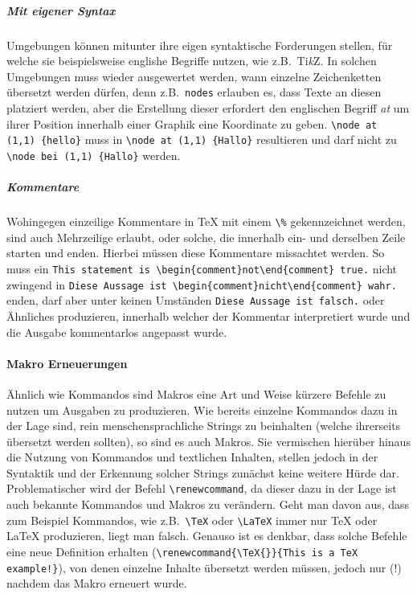\subparagraph*{Mit eigener Syntax}\par
Umgebungen können mitunter ihre eigen syntaktische Forderungen stellen, für welche sie beispielsweise englishe Begriffe nutzen, wie z.B.\ Ti\textit{k}Z. In solchen Umgebungen muss wieder ausgewertet werden, wann einzelne Zeichenketten übersetzt werden dürfen, denn z.B.\ \texttt{nodes} erlauben es, dass Texte an diesen platziert werden, aber die Erstellung dieser erfordert den englischen Begriff \textit{at} um ihrer Position innerhalb einer Graphik eine Koordinate zu geben.
\verb|\node at (1,1) {hello}| muss in \verb|\node at (1,1) {Hallo}| resultieren und darf nicht zu \verb|\node bei (1,1) {Hallo}| werden. 

\subparagraph*{Kommentare}\par
Wohingegen einzeilige Kommentare in \TeX{} mit einem \verb"\%" gekennzeichnet werden, sind auch Mehrzeilige erlaubt, oder solche, die innerhalb ein- und derselben Zeile starten und enden. Hierbei müssen diese Kommentare missachtet werden. So muss ein \verb|This statement is \begin{comment}not\end{comment} true.| nicht zwingend in \verb|Diese Aussage ist \begin{comment}nicht\end{comment} wahr.| enden, darf aber unter keinen Umständen \verb|Diese Aussage ist falsch.| oder Ähnliches produzieren, innerhalb welcher der Kommentar interpretiert wurde und die Ausgabe kommentarlos angepasst wurde.

\paragraph*{Makro Erneuerungen}\par
Ähnlich wie Kommandos sind Makros eine Art und Weise kürzere Befehle zu nutzen um Ausgaben zu produzieren.%
Wie bereits einzelne Kommandos dazu in der Lage sind, rein menschensprachliche Strings zu beinhalten (welche ihrerseits übersetzt werden sollten), so sind es auch Makros. Sie vermischen hierüber hinaus die Nutzung von Kommandos und textlichen Inhalten, stellen jedoch in der Syntaktik und der Erkennung solcher Strings zunächst keine weitere Hürde dar. Problematischer wird der Befehl \verb|\renewcommand|, da dieser dazu in der Lage ist auch bekannte Kommandos und Makros zu verändern. Geht man davon aus, dass zum Beispiel Kommandos, wie z.B.\ \verb|\TeX| oder \verb|\LaTeX| immer nur \TeX{} oder \LaTeX{} produzieren, liegt man falsch. Genauso ist es denkbar, dass solche Befehle eine neue Definition erhalten (\verb|\renewcommand{\TeX{}}{This is a TeX example!}|), von denen einzelne Inhalte übersetzt werden müssen, jedoch nur (!) nachdem das Makro erneuert wurde.

